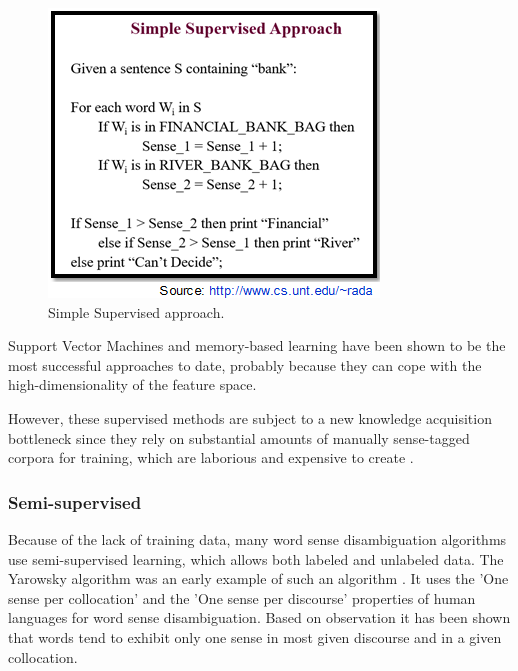 \begin{figure}[tbh]
	\begin{center}
		\includegraphics[width=\columnwidth]{Union_Background_Chart_sup3}
	\end{center}
	\caption{Simple Supervised approach.}
\end{figure}

Support Vector Machines and memory-based learning have been shown to be the most successful approaches to date, probably because they can cope with the high-dimensionality of the feature space. 

However, these supervised methods are subject to a new knowledge acquisition bottleneck since they rely on substantial amounts of manually sense-tagged corpora for training, which are laborious and expensive to create \cite{aramossoto2016onthe}.

\subsubsection*{Semi-supervised}

Because of the lack of training data, many word sense disambiguation algorithms use semi-supervised learning, which allows both labeled and unlabeled data. 
The Yarowsky algorithm was an early example of such an algorithm \cite{Gartner201317}. It uses the 'One sense per collocation' and the 'One sense per discourse' properties of human languages for word sense disambiguation. 
Based on observation it has been shown that words tend to exhibit only one sense in most given discourse and in a given collocation. \cite{5599823}

